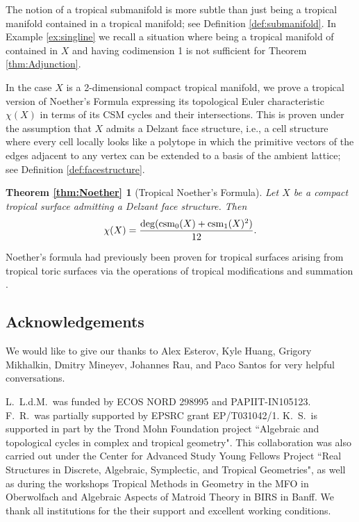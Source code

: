 The notion of a tropical submanifold is more subtle than just being a tropical manifold contained in a tropical manifold; see Definition \ref{def:submanifold}. In Example \ref{ex:singline} we recall a situation where being a tropical manifold of contained in $X$ and having codimension 1 is not sufficient for Theorem \ref{thm:Adjunction}. 
 
 
In the case $X$ is a 2-dimensional compact tropical manifold, we prove a tropical version of Noether's Formula expressing its topological Euler characteristic $\chi(X)$ in terms of its CSM cycles and their intersections. This is proven under the assumption that $X$ admits a Delzant face structure, i.e., a cell structure where every cell locally looks like a polytope in which the primitive vectors of the edges adjacent to any vertex can be extended to a basis of the ambient lattice; see Definition \ref{def:facestructure}.
 
\newtheorem*{thm:Noether}{Theorem \ref{thm:Noether}}
\begin{thm:Noether}[Tropical Noether's Formula]
Let $X$ be a compact tropical surface admitting a Delzant face structure.
Then 
$$\chi(X) = \frac{\deg( \operatorname{csm}_0(X) + \operatorname{csm}_1(X)^2) }{12}.$$
\end{thm:Noether}
Noether's formula had previously been proven for tropical surfaces arising from tropical toric surfaces via the operations of tropical modifications and summation \cite{Shaw:Surf}. 

 
\subsection*{Acknowledgements}
We would like to give our thanks to Alex Esterov, Kyle Huang, Grigory Mikhalkin, Dmitry Mineyev, Johannes Rau, and Paco Santos for very helpful conversations.  

L.~L.d.M.~was funded by ECOS NORD 298995 and PAPIIT-IN105123. 
F.~R.~was partially supported by EPSRC grant EP/T031042/1.
K.~S.~is supported in part by the Trond Mohn Foundation project ``Algebraic and topological cycles in complex and tropical geometry". 
This collaboration was also carried out under the  Center for Advanced Study Young Fellows Project ``Real Structures in Discrete, Algebraic, Symplectic, and Tropical Geometries", as well as during the workshops Tropical Methods in Geometry in the MFO in Oberwolfach and Algebraic Aspects of Matroid Theory in BIRS in Banff. We thank all  institutions for the their support and excellent working conditions.
 





